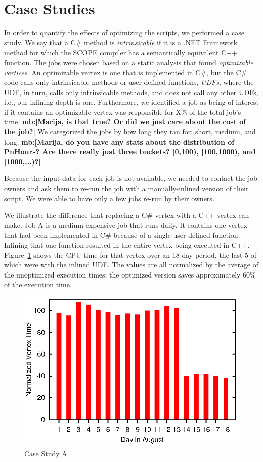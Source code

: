 \section{Case Studies}
In order to quantify the effects of optimizing the scripts, we performed a case study.
We say that a C\# method is {\em intrinsicable} if it is a .NET Framework method for which the SCOPE compiler has a semantically equivalent C++ function.
The jobs were chosen based on a static analysis that found {\em optimizable vertices}.
An optimizable vertex is one that is implemented in C\#, but the C\# code calls only intrinsicable methods or user-defined functions, {\em UDFs}, where the UDF, in turn, calls only intrinsicable methods, and does not call any other UDFs, i.e., our inlining depth is one.
Furthermore, we identified a job as being of interest if it contains an optimizable vertex was responsible for X\% of the total job's time.
{\bf mb:[Marija, is that true? Or did we just care about the cost of the job?]}
We categorized the jobs by how long they ran for: short, medium, and long.
{\bf mb:[Marija, do you have any stats about the distribution of PnHours? Are there really just three buckets? [0,100), [100,1000), and [1000,...)?]}

Because the input data for each job is not available, we needed to contact the job owners and ask them to re-run the job with a manually-inlined version of their script.
We were able to have only a few jobs re-run by their owners.

We illustrate the difference that replacing a C\# vertex with a C++ vertex can make.
Job A is a medium-expensive job that runs daily.
It contains one vertex that had been implemented in  C\# because of a single user-defined function.
Inlining that one function resulted in the entire vertex being executed in C++.
Figure~\ref{fig:CaseStudyA} shows the CPU time for that vertex over an 18 day period, the last 5 of which were with the inlined UDF.
The values are all normalized by the average of the unoptimized execution times; the optimized version saves approximately 60\% of the execution time.

\begin{figure}[ht]
\includegraphics{graphs/normalizedTimes}
\caption{Case Study A \label{fig:CaseStudyA}}
\end{figure}

